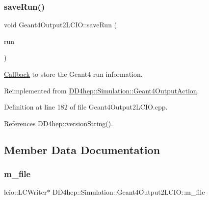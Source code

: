 \hypertarget{class_d_d4hep_1_1_simulation_1_1_geant4_output2_l_c_i_o_a0fa2240decba857840eed494d6349f5f}{}\label{class_d_d4hep_1_1_simulation_1_1_geant4_output2_l_c_i_o_a0fa2240decba857840eed494d6349f5f} 
\subsubsection{\texorpdfstring{save\+Run()}{saveRun()}}
{\footnotesize\ttfamily void Geant4\+Output2\+L\+C\+I\+O\+::save\+Run (\begin{DoxyParamCaption}\item[{const G4\+Run $\ast$}]{run }\end{DoxyParamCaption})\hspace{0.3cm}{\ttfamily [virtual]}}



\hyperlink{class_d_d4hep_1_1_callback}{Callback} to store the Geant4 run information. 



Reimplemented from \hyperlink{class_d_d4hep_1_1_simulation_1_1_geant4_output_action_a4016b3e0ee787a3ac3d1fcd7a4c84a68}{D\+D4hep\+::\+Simulation\+::\+Geant4\+Output\+Action}.



Definition at line 182 of file Geant4\+Output2\+L\+C\+I\+O.\+cpp.



References D\+D4hep\+::version\+String().



\subsection{Member Data Documentation}
\hypertarget{class_d_d4hep_1_1_simulation_1_1_geant4_output2_l_c_i_o_a53ad4cd77ad5b3b95105cee1ac2ca6f8}{}\label{class_d_d4hep_1_1_simulation_1_1_geant4_output2_l_c_i_o_a53ad4cd77ad5b3b95105cee1ac2ca6f8} 
\subsubsection{\texorpdfstring{m\+\_\+file}{m\_file}}
{\footnotesize\ttfamily lcio\+::\+L\+C\+Writer$\ast$ D\+D4hep\+::\+Simulation\+::\+Geant4\+Output2\+L\+C\+I\+O\+::m\+\_\+file\hspace{0.3cm}{\ttfamily [protected]}}



